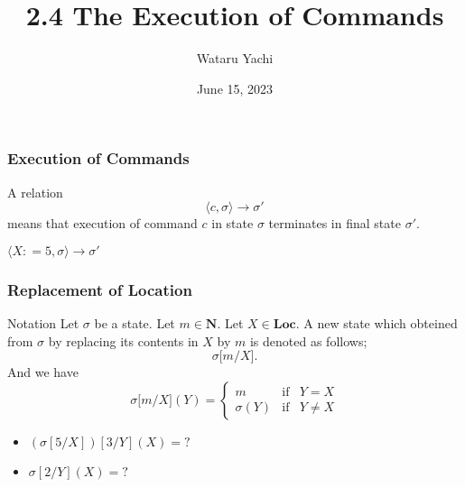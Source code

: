 \documentclass[12pt,aspectratio=169]{beamer}
\title{ 2.4 The Execution of Commands}
\author{Wataru Yachi}
\institute{JAIST}
\date{June 15, 2023}
\newcommand{\m}[1]{\mathsf{#1}}
\def\coloneqq{\mathrel{\mathop:}=}%
\begin{document}
\maketitle

\begin{frame}
    \frametitle{Execution of Commands}
    \begin{definition}
        A relation
        \[
            \langle c, \sigma \rangle \rightarrow \sigma'
        \]
        means that execution of command $c$ in state $\sigma$ terminates in final state $\sigma'$.
    \end{definition}


    \begin{example}
        $\langle X \coloneqq 5, \sigma \rangle \rightarrow \sigma'$
    \end{example}
\end{frame}

\begin{frame}
    \frametitle{Replacement of Location}

    \begin{block}{Notation}
        Let $\sigma$ be a state. Let $m \in \mathbf{N}$. Let $X \in \mathbf{Loc}$.
        A new state which obteined from $\sigma$ by replacing its contents in $X$ by $m$ is denoted as follows;
        \[ \sigma \lbrack m / X \rbrack. \]
        And we have
        \[
            \sigma \lbrack m/X \rbrack (Y) = \left\{ \begin{array}{lcl}
                m & \mathrm{if} & Y = X\\
                \sigma(Y) & \mathrm{if} & Y \neq X
            \end{array} \right.
        \]
    \end{block}

    \begin{example}[Quiz]
        \begin{itemize}
            \item $(\sigma[5/X])[3/Y](X) = \m{?}$
            \item $\sigma[2/Y](X) = \m{?}$
        \end{itemize}
    \end{example}
\end{frame}
\end{document}
